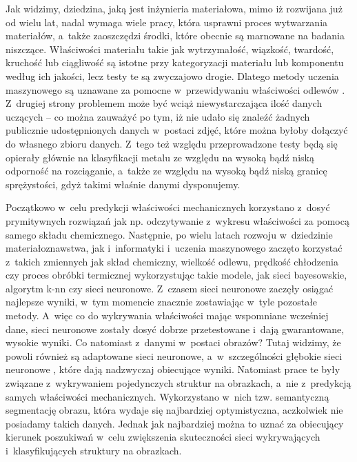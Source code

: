 Jak widzimy, dziedzina, jaką jest inżynieria materiałowa, mimo iż rozwijana już od wielu lat, nadal wymaga wiele pracy, która usprawni proces wytwarzania materiałów, a~także zaoszczędzi środki, które obecnie są marnowane na badania niszczące. Właściwości materiału takie jak wytrzymałość, wiązkość, twardość, kruchość lub ciągliwość są istotne przy kategoryzacji materiału lub komponentu według ich jakości, lecz testy te są zwyczajowo drogie. Dlatego metody uczenia maszynowego są uznawane za pomocne w~przewidywaniu właściwości odlewów \cite{Stoll21}. Z~drugiej strony problemem może być wciąż niewystarczająca ilość danych uczących –  co można zauważyć po tym, iż nie udało się znaleźć żadnych publicznie udostępnionych danych w~postaci zdjęć, które można byłoby dołączyć do własnego zbioru danych. Z~tego też względu przeprowadzone testy będą się opierały głównie na klasyfikacji metalu ze względu na wysoką bądź niską odporność na rozciąganie, a~także ze względu na wysoką bądź niską granicę sprężystości, gdyż takimi właśnie danymi dysponujemy.

Początkowo w~celu predykcji właściwości mechanicznych korzystano z~dosyć prymitywnych rozwiązań jak np. odczytywanie z~wykresu właściwości za pomocą samego składu chemicznego. Następnie, po wielu latach rozwoju w~dziedzinie materiałoznawstwa, jak i~informatyki i~uczenia maszynowego zaczęto korzystać z~takich zmiennych jak skład chemiczny, wielkość odlewu, prędkość chłodzenia czy proces obróbki termicznej wykorzystując takie modele, jak sieci bayesowskie, algorytm k-nn czy sieci neuronowe. Z~czasem sieci neuronowe zaczęły osiągać najlepsze wyniki, w~tym momencie znacznie zostawiając w~tyle pozostałe metody. A~więc co do wykrywania właściwości mając wspomniane wcześniej dane, sieci neuronowe zostały dosyć dobrze przetestowane i~dają gwarantowane, wysokie wyniki. Co natomiast z~danymi w~postaci obrazów? Tutaj widzimy, że powoli również są adaptowane sieci neuronowe, a~w~szczególności głębokie sieci neuronowe \cite{Azimi18, Pauly16}, które dają nadzwyczaj obiecujące wyniki. Natomiast prace te były związane z~wykrywaniem pojedynczych struktur na obrazkach, a~nie z~predykcją samych właściwości mechanicznych. Wykorzystano w~nich tzw. semantyczną segmentację obrazu, która wydaje się najbardziej optymistyczna, aczkolwiek nie posiadamy takich danych. Jednak jak najbardziej można to uznać za obiecujący kierunek poszukiwań w~celu zwiększenia skuteczności sieci wykrywających i~klasyfikujących struktury na obrazkach.


